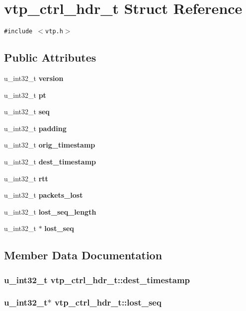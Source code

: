 \section{vtp\_\-ctrl\_\-hdr\_\-t Struct Reference}
\label{structvtp__ctrl__hdr__t}
{\tt \#include $<$vtp.h$>$}

\subsection*{Public Attributes}
\begin{CompactItemize}
\item 
u\_\-int32\_\-t {\bf version}
\item 
u\_\-int32\_\-t {\bf pt}
\item 
u\_\-int32\_\-t {\bf seq}
\item 
u\_\-int32\_\-t {\bf padding}
\item 
u\_\-int32\_\-t {\bf orig\_\-timestamp}
\item 
u\_\-int32\_\-t {\bf dest\_\-timestamp}
\item 
u\_\-int32\_\-t {\bf rtt}
\item 
u\_\-int32\_\-t {\bf packets\_\-lost}
\item 
u\_\-int32\_\-t {\bf lost\_\-seq\_\-length}
\item 
u\_\-int32\_\-t $\ast$ {\bf lost\_\-seq}
\end{CompactItemize}


\subsection{Member Data Documentation}
\subsubsection{\setlength{\rightskip}{0pt plus 5cm}u\_\-int32\_\-t {\bf vtp\_\-ctrl\_\-hdr\_\-t::dest\_\-timestamp}}\label{structvtp__ctrl__hdr__t_o5}


\subsubsection{\setlength{\rightskip}{0pt plus 5cm}u\_\-int32\_\-t$\ast$ {\bf vtp\_\-ctrl\_\-hdr\_\-t::lost\_\-seq}}\label{structvtp__ctrl__hdr__t_o9}


